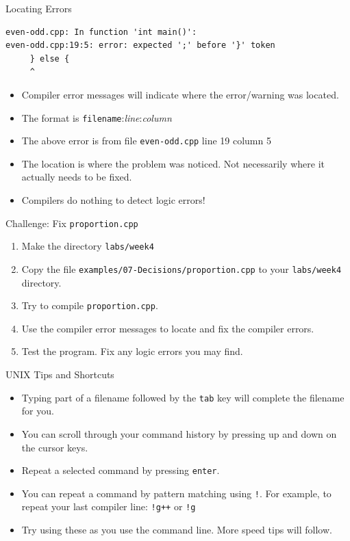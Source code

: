 \documentclass[]{beamer}
\begin{document}
\begin{frame}[fragile]{Locating Errors}
  \begin{BVerbatim}
even-odd.cpp: In function 'int main()':
even-odd.cpp:19:5: error: expected ';' before '}' token
     } else {
     ^
  \end{BVerbatim}
  \begin{itemize}[<+->]
    \item Compiler error messages will indicate where the error/warning was located.
    \item The format is \texttt{filename}:\textit{line}:\textit{column}
    \item The above error is from file \texttt{even-odd.cpp} line 19 column 5
    \item The location is where the problem was noticed.  Not necessarily where
      it actually needs to be fixed.
    \item Compilers do nothing to detect logic errors!
  \end{itemize}
\end{frame}

\begin{frame}{Challenge: Fix \texttt{proportion.cpp}}
  \begin{enumerate}[<+->]
      \item Make the directory \texttt{labs/week4}
      \item Copy the file \texttt{examples/07-Decisions/proportion.cpp} to your \texttt{labs/week4} directory.
      \item Try to compile \texttt{proportion.cpp}. 
      \item Use the compiler error messages to locate and fix the compiler errors. 
      \item Test the program.  Fix any logic errors you may find.
  \end{enumerate}
\end{frame}

\begin{frame}{UNIX Tips and Shortcuts}
    \begin{itemize}[<+->]
        \item Typing part of a filename followed by the \texttt{tab} key will complete the filename for you.
        \item You can scroll through your command history by pressing up and down on the cursor keys.
        \item Repeat a selected command by pressing \texttt{enter}.
        \item You can repeat a command by pattern matching using \texttt{!}.  For example, to repeat your last compiler line:
          \newline\texttt{!g++}
          \newline or
          \newline\texttt{!g}
        \item Try using these as you use the command line.  More speed tips will follow.
    \end{itemize}
\end{frame}
\end{document}
